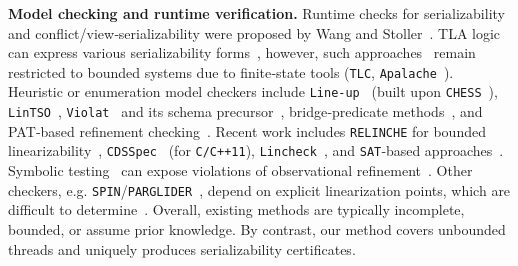 \smallskip
\noindent
\textbf{Model checking and runtime verification.}
%
Runtime checks for serializability and conflict/view‐serializability were proposed by Wang and Stoller~\cite{WaSt06a,WaSt06b}.  
TLA logic~\cite{La94} can express various serializability forms~\cite{CoOlPnTuZu07}, however, such approaches~\cite{SoVaVi20,Ho24} remain restricted to bounded systems due to finite‐state tools (\texttt{TLC}, \texttt{Apalache}~\cite{YuMaLa99,KoKuTr19}).  
Heuristic or enumeration model checkers include \texttt{Line-up}~\cite{BuDeMuTa10} (built upon \texttt{CHESS}~\cite{MuQaBaBaNaNe08}), \texttt{LinTSO}~\cite{BuGoMuYa12}, \texttt{Violat}~\cite{EmEn19} and its schema precursor~\cite{EmEn18}, bridge‐predicate methods~\cite{BuNeSe11,BuSe09}, and PAT‐based refinement checking~\cite{LiChLiSuZhDo12,SuLuDoPa09,LiChLiSu09,Zh11}.  
Recent work includes \texttt{RELINCHE} for bounded linearizability~\cite{GoKoVa25}, \texttt{CDSSpec}~\cite{OuDe17} (for \texttt{C/C++11}), \texttt{Lincheck}~\cite{KoDeSoTsAl23}, and \texttt{SAT}‐based approaches~\cite{BuAlMa07}.  
Symbolic testing~\cite{EmEnHa15} can expose violations of observational refinement~\cite{FiOhRiYa10,BoEmCoHa15}.  
Other checkers, e.g. \texttt{SPIN}/\texttt{PARGLIDER}~\cite{Fl04,VeYaYo09,Ho97,VeYa08}, depend on explicit linearization points, which are difficult to determine~\cite{VeYaYo09}.  
Overall, existing methods are typically incomplete, bounded, or assume prior knowledge.  
By contrast, our method covers unbounded threads and uniquely produces serializability certificates.



